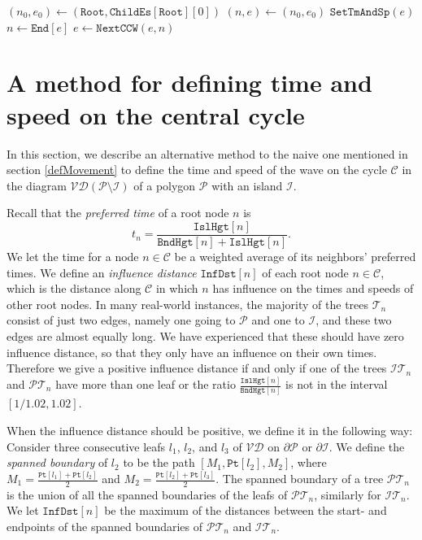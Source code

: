 \documentclass[3p]{elsarticle}
\newcommand{\VD}{\mathcal{VD}}
\newcommand{\PP}{\mathcal{P}}
\newcommand{\HH}{\mathcal{I}}
\newcommand{\CC}{\mathcal{C}}
\newcommand{\TT}{\mathcal{T}}
\newcommand{\PT}{\PP\TT}
\newcommand{\HT}{\HH\TT}
\newcommand{\childEdges}{\texttt{ChildEs}}
\newcommand{\nodeStart}{\texttt{Start}}
\newcommand{\nodeEnd}{\texttt{End}}
\newcommand{\getNextEdge}{\texttt{NextCCW}}
\newcommand{\height}{\texttt{Hgt}}
\newcommand{\holeHeight}{\texttt{Isl}\height}
\newcommand{\boundaryHeight}{\texttt{Bnd}\height}
\newcommand{\setTimesAndSpeeds}{\texttt{SetTmAndSp}}
\newcommand{\setAllTimesAndSpeeds}{\texttt{SetAllTmAndSp}}
\newcommand{\rootNode}{\texttt{Root}}
\newcommand{\point}{\texttt{Pt}}
\newcommand{\inflDist}{\texttt{InfDst}}
\begin{document}
\begin{algorithm}[h]
\scriptsize
\LinesNumbered
\DontPrintSemicolon
\SetArgSty{}
  $(n_0,e_0)\gets (\rootNode,\childEdges[\rootNode][0])$\;
  $(n,e)\gets (n_0,e_0)$\;
   {
    \uIf {$n=\nodeStart[e]$} {
      $\setTimesAndSpeeds(e)$\;
      $n\gets \nodeEnd[e]$\;
    } \Else {
      $n\gets \nodeStart[e]$\;
    }
    $e\gets \getNextEdge(e,n)$\;
  }
\caption{$\setAllTimesAndSpeeds()$}
\label{setAllTimesAndSpeeds}
\end{algorithm}

\section{A method for defining time and speed on the central cycle}\label{appB}

In this section, we describe an alternative method to the naive one mentioned in section
\ref{defMovement} to define the time and speed of the wave on the cycle $\CC$
in the diagram $\VD(\PP\setminus\HH)$ of a polygon $\PP$ with an island $\HH$.

Recall that the \emph{preferred time} of a root node $n$ is
$$t_n=\frac{\holeHeight[n]}{\boundaryHeight[n] + \holeHeight[n]}.$$
We let the time for a node $n\in\CC$ be a weighted average of
its neighbors' preferred times.
We define an \emph{influence distance} $\inflDist[n]$
of each root node
$n\in\CC$, which is the distance along $\CC$ in which $n$ has influence on the times and
speeds of other root nodes. In many real-world instances, the majority of the trees
$\TT_n$ consist of just two edges, namely one going to $\PP$ and one to $\HH$, and these two
edges are almost equally long. We have experienced that these should have zero influence distance,
so that they only have an influence on their own times.
Therefore we give a positive influence distance if and only if one of the trees
$\HT_n$ and $\PT_n$ have more than one leaf or the ratio
$\frac{\holeHeight[n]}{\boundaryHeight[n]}$ is not in the interval $[1/1.02,1.02]$.

When the influence distance should be positive, we define it in the following way:
Consider three consecutive leafs $l_1$, $l_2$, and $l_3$ of $\VD$
on $\partial\PP$ or $\partial\HH$. We define the \emph{spanned boundary} of $l_2$
to be the path $[M_1,\point[l_2],M_2]$, where $M_1=\frac{\point[l_1]+\point[l_2]}{2}$
and $M_2=\frac{\point[l_2]+\point[l_3]}{2}$.
The spanned boundary of a tree $\PT_n$
is the union of all the spanned boundaries of the leafs of $\PT_n$, similarly for $\HT_n$.
We let $\inflDist[n]$ be the maximum of the distances between the start- and endpoints of the
spanned boundaries of $\PT_n$ and $\HT_n$.
\end{document}
